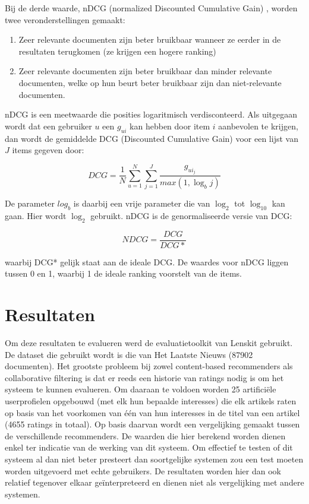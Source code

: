 Bij de derde waarde, nDCG (normalized Discounted Cumulative Gain) \cite{Burges2005}, worden twee veronderstellingen gemaakt:
\begin{enumerate}
\item Zeer relevante documenten zijn beter bruikbaar wanneer ze eerder in de resultaten terugkomen (ze krijgen een hogere ranking)
\item Zeer relevante documenten zijn beter bruikbaar dan minder relevante documenten, welke op hun beurt beter bruikbaar zijn dan niet-relevante documenten.
\end{enumerate}

nDCG is een meetwaarde die posities logaritmisch verdisconteerd. Als uitgegaan wordt dat een gebruiker $u$ een  $g_{ui}$ kan hebben door item $i$ aanbevolen te krijgen, dan wordt de gemiddelde DCG (Discounted Cumulative Gain) voor een lijst van $J$ items gegeven door:

\begin{equation}
DCG = \frac{1}{N}\sum_{u=1}^{N}\sum_{j=1}^{J}\frac{g_{ui_j}}{max(1,\log_bj)}
\end{equation}

De parameter $log_b$ is daarbij een vrije parameter die van $\log_2$ tot $\log_{10}$ kan gaan. Hier wordt $\log_2$ gebruikt. nDCG is de genormaliseerde versie van DCG:

\begin{equation}
NDCG = \frac{DCG}{DCG*}
\end{equation}

waarbij DCG* gelijk staat aan de ideale DCG. De waardes voor nDCG liggen tussen 0 en 1, waarbij 1 de ideale ranking voorstelt van de items.


\section{Resultaten}
Om deze resultaten te evalueren werd de evaluatietoolkit van Lenskit gebruikt. De dataset die gebruikt wordt is die van Het Laatste Nieuws (87902 documenten). Het grootste probleem bij zowel content-based recommenders als collaborative filtering is dat er reeds een historie van ratings nodig is om het systeem te kunnen evalueren. Om daaraan te voldoen worden 25 artifici\"ele userprofielen opgebouwd (met elk hun bepaalde interesses) die elk artikels raten op basis van het voorkomen van \'e\'en van hun interesses in de titel van een artikel (4655 ratings in totaal). Op basis daarvan wordt een vergelijking gemaakt tussen de verschillende recommenders. De waarden die hier berekend worden dienen enkel ter indicatie van de werking van dit systeem. Om effectief te testen of dit systeem al dan niet beter presteert dan soortgelijke systemen zou een test moeten worden uitgevoerd met echte gebruikers. De resultaten worden hier dan ook relatief tegenover elkaar ge\"interpreteerd en dienen niet als vergelijking met andere systemen.

